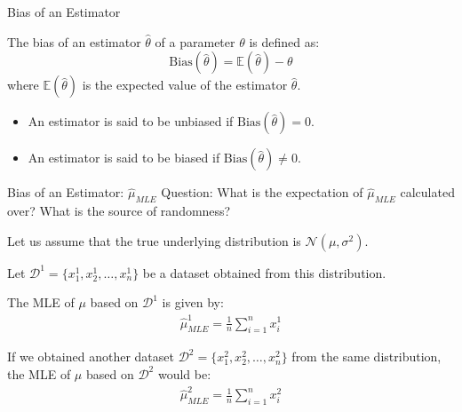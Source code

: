 \documentclass[handout]{beamer}
\begin{document}
    \begin{frame}{Bias of an Estimator}
        \begin{tcolorbox}[colback=metropolisblue!5,colframe=metropolisblue,title=Bias of an Estimator]
            The bias of an estimator $\hat{\theta}$ of a parameter $\theta$ is defined as:
            \[
                \text{Bias}(\hat{\theta}) = \mathbb{E}(\hat{\theta}) - \theta
            \]
            where $\mathbb{E}(\hat{\theta})$ is the expected value of the estimator $\hat{\theta}$.
        \end{tcolorbox}
        \begin{itemize}
            \item An estimator is said to be unbiased if $\text{Bias}(\hat{\theta}) = 0$.
            \item An estimator is said to be biased if $\text{Bias}(\hat{\theta}) \neq 0$.
        \end{itemize}
        
    \end{frame}

    \begin{frame}{Bias of an Estimator: $\hat{\mu}_{MLE}$}
        \pause 
        Question: What is the expectation of $\hat{\mu}_{MLE}$ calculated over? What is the source of randomness?
        
        Let us assume that the true underlying distribution is $\mathcal{N}(\mu, \sigma^2)$.
    
        Let $\mathcal{D}^1 = \{x^1_1, x^1_2, \ldots, x^1_n\}$ be a dataset obtained from this distribution. 
    
        The MLE of $\mu$ based on $\mathcal{D}^1$ is given by:
        \begin{align*}
            \hat{\mu}_{MLE}^1 = \frac{1}{n} \sum_{i=1}^n x^1_i
        \end{align*}
    
        If we obtained another dataset $\mathcal{D}^2 = \{x^2_1,  x^2_2, \ldots, x^2_n\}$ from the same distribution, the MLE of $\mu$ based on $\mathcal{D}^2$ would be:
        \begin{align*}
            \hat{\mu}_{MLE}^2 = \frac{1}{n} \sum_{i=1}^n x^2_i
        \end{align*}
    \end{frame}
    
\end{document}
